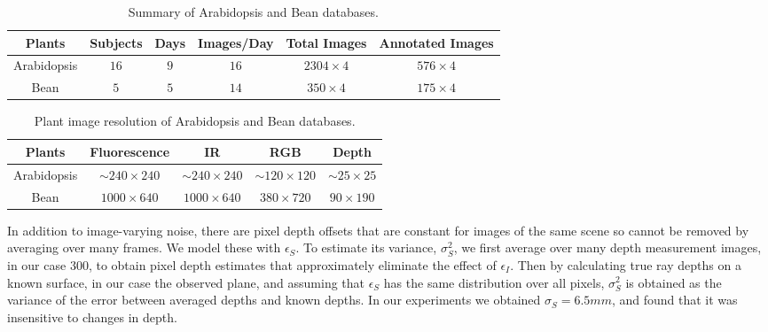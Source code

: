 \begin{table*}[t!]
\begin{center}
\caption{Summary of Arabidopsis and Bean databases.}
\label{tab:stat}
\begin{tabular}{c|c|c|c|c|c}
      \hline
      Plants     & Subjects & Days & Images/Day & Total Images & Annotated Images \\
      \hline
      Arabidopsis &  $16$      &  $9$   &     $16$     &     $2304\times 4$     &       $576\times 4$     \\
      \hline
      Bean        &   $5$      &  $5$   &     $14$     &     $350\times 4$       &       $175\times 4$  \\
      \hline
\end{tabular}
\end{center}
\end{table*}



\begin{table*}
\begin{center}
\caption{Plant image resolution of Arabidopsis and Bean databases.}
\label{tab:resolution}
\begin{tabular}{c|c|c|c|c}
      \hline
      Plants     & Fluorescence       & IR        & RGB      & Depth     \\
      \hline
      Arabidopsis &  $\sim$$240\times240$ &  $\sim$$240\times240$  & $\sim$$120\times120$  & $\sim$$25\times25$  \\
      Bean        & $1000\times640$ & $1000\times640$ & $380\times720$ & $90\times190$    \\
      \hline
\end{tabular}
\end{center}
\end{table*}

In addition to image-varying noise, there are pixel depth offsets that are constant for images of the same scene so cannot be removed by averaging over many frames.  We model these with $\epsilon_S$.  To estimate its variance, $\sigma_S^2$, we first average over many depth measurement images, in our case 300, to obtain pixel depth estimates that approximately eliminate the effect of $\epsilon_I$.  Then by calculating true ray depths on a known surface, in our case the observed plane, and assuming that $\epsilon_S$ has the same distribution over all pixels, $\sigma_S^2$ is obtained as the variance of the error between averaged depths and known depths.  In our experiments we obtained $\sigma_S=6.5mm$, and found that it was insensitive to changes in depth.




